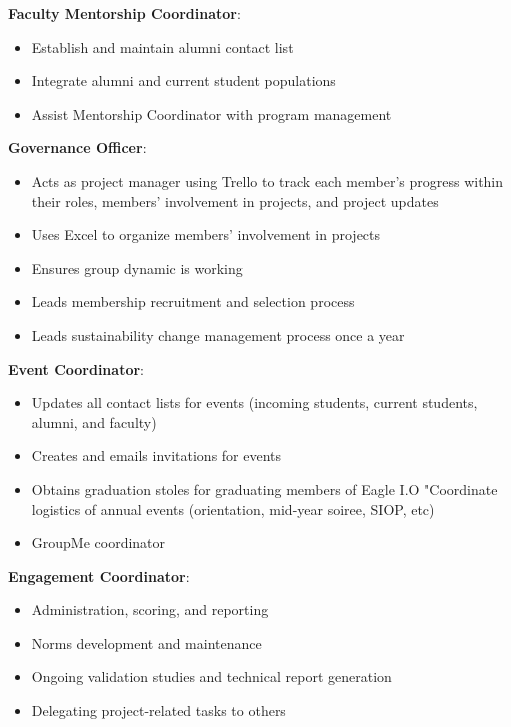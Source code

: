 \documentclass[
]{book}
\providecommand{\tightlist}{%
  \setlength{\itemsep}{0pt}\setlength{\parskip}{0pt}}
\begin{document}
\textbf{Faculty Mentorship Coordinator}:

\begin{itemize}
\tightlist
\item
  Establish and maintain alumni contact list\\
\item
  Integrate alumni and current student populations\\
\item
  Assist Mentorship Coordinator with program management
\end{itemize}

\textbf{Governance Officer}:

\begin{itemize}
\tightlist
\item
  Acts as project manager using Trello to track each member's progress within their roles, members' involvement in projects, and project updates
\item
  Uses Excel to organize members' involvement in projects
\item
  Ensures group dynamic is working
\item
  Leads membership recruitment and selection process\\
\item
  Leads sustainability change management process once a year
\end{itemize}

\textbf{Event Coordinator}:

\begin{itemize}
\tightlist
\item
  Updates all contact lists for events (incoming students, current students, alumni, and faculty)
\item
  Creates and emails invitations for events
\item
  Obtains graduation stoles for graduating members of Eagle I.O "Coordinate logistics of annual events (orientation, mid-year soiree, SIOP, etc)
\item
  GroupMe coordinator
\end{itemize}

\textbf{Engagement Coordinator}:

\begin{itemize}
\tightlist
\item
  Administration, scoring, and reporting
\item
  Norms development and maintenance
\item
  Ongoing validation studies and technical report generation\\
\item
  Delegating project-related tasks to others
\end{itemize}
\end{document}

